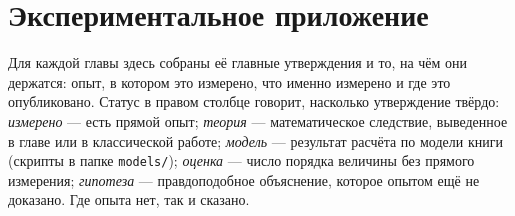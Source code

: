 \chapter{Экспериментальное приложение}
\label{sec:supplement}

Для каждой главы здесь собраны её главные утверждения и то, на чём они держатся: опыт, в котором это измерено, что именно измерено и где это опубликовано. Статус в правом столбце говорит, насколько утверждение твёрдо: \emph{измерено} --- есть прямой опыт; \emph{теория} --- математическое следствие, выведенное в главе или в классической работе; \emph{модель} --- результат расчёта по модели книги (скрипты в папке \texttt{models/}); \emph{оценка} --- число порядка величины без прямого измерения; \emph{гипотеза} --- правдоподобное объяснение, которое опытом ещё не доказано. Где опыта нет, так и сказано.
























